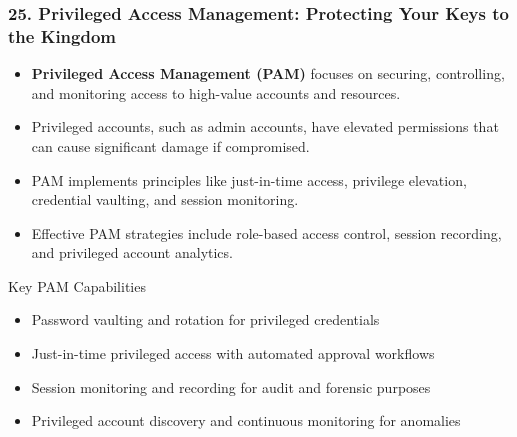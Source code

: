 \documentclass{beamer}
\begin{document}
		\begin{frame}
			\frametitle{25. Privileged Access Management: Protecting Your Keys to the Kingdom}
			\begin{itemize}
				\item \textbf{Privileged Access Management (PAM)} focuses on securing, controlling, and monitoring access to high-value accounts and resources.
				\item Privileged accounts, such as admin accounts, have elevated permissions that can cause significant damage if compromised.
				\item PAM implements principles like just-in-time access, privilege elevation, credential vaulting, and session monitoring.
				\item Effective PAM strategies include role-based access control, session recording, and privileged account analytics.
			\end{itemize}
			
			\begin{block}{Key PAM Capabilities}
				\scriptsize
				\begin{itemize}
					\item Password vaulting and rotation for privileged credentials
					\item Just-in-time privileged access with automated approval workflows
					\item Session monitoring and recording for audit and forensic purposes
					\item Privileged account discovery and continuous monitoring for anomalies
				\end{itemize}
			\end{block}
		\end{frame}
		
\end{document}
